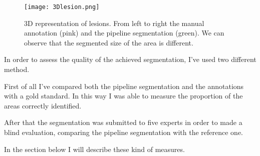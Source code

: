 \documentclass{standalone}
\begin{document}
	\begin{figure}[h!]
	
		\centering 
			\texttt{[image: 3Dlesion.png]}
			\caption{3D representation of lesions. From left to right the manual annotation (pink) and the pipeline segmentation (green). We can observe that the segmented size of the area is different.}\label{fig:3Dlabel}		
	\end{figure}
	
	
	In order to assess the quality of the achieved segmentation, I've used two different method. 
	
	First of all I've compared both the pipeline segmentation and the annotations with a gold standard. In this way I was able to measure the proportion of the areas correctly identified.
	
	After that the segmentation was submitted to five experts in order to made a blind evaluation, comparing the pipeline segmentation with the reference one.
	
	In the section below I will describe these kind of measures.
	
	
\end{document}
